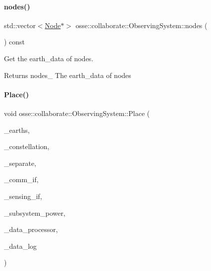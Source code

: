 \paragraph{\texorpdfstring{nodes()}{nodes()}}
{\footnotesize\ttfamily std\+::vector$<$\hyperlink{classosse_1_1collaborate_1_1_node}{Node}$\ast$$>$ osse\+::collaborate\+::\+Observing\+System\+::nodes (\begin{DoxyParamCaption}{ }\end{DoxyParamCaption}) const\hspace{0.3cm}{\ttfamily [inline]}}



Get the earth\+\_\+data of nodes. 

\begin{DoxyReturn}{Returns}
nodes\+\_\+ The earth\+\_\+data of nodes 
\end{DoxyReturn}
\mbox{\label{classosse_1_1collaborate_1_1_observing_system_a083b14c76f2e4af95d0228435b0644a4}} 
\paragraph{\texorpdfstring{Place()}{Place()}}
{\footnotesize\ttfamily void osse\+::collaborate\+::\+Observing\+System\+::\+Place (\begin{DoxyParamCaption}\item[{const std\+::vector$<$ \hyperlink{classosse_1_1collaborate_1_1_platform_earth}{Platform\+Earth} $>$ \&}]{\+\_\+earths,  }\item[{const uint16\+\_\+t \&}]{\+\_\+constellation,  }\item[{const bool \&}]{\+\_\+separate,  }\item[{const \hyperlink{classosse_1_1collaborate_1_1_subsystem_comm}{Subsystem\+Comm} \&}]{\+\_\+comm\+\_\+if,  }\item[{const \hyperlink{classosse_1_1collaborate_1_1_subsystem_sensing}{Subsystem\+Sensing} \&}]{\+\_\+sensing\+\_\+if,  }\item[{const \hyperlink{classosse_1_1collaborate_1_1_subsystem_power}{Subsystem\+Power} \&}]{\+\_\+subsystem\+\_\+power,  }\item[{\hyperlink{classosse_1_1collaborate_1_1_data_processor}{Data\+Processor} $\ast$}]{\+\_\+data\+\_\+processor,  }\item[{\hyperlink{classosse_1_1collaborate_1_1_data_logger}{Data\+Logger} $\ast$}]{\+\_\+data\+\_\+log }\end{DoxyParamCaption})}



